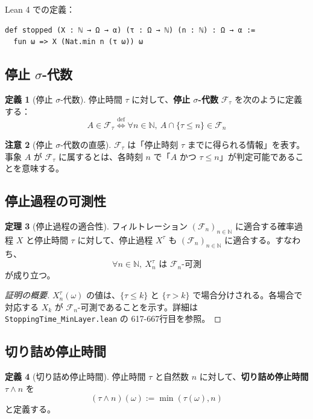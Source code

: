 \documentclass[12pt,a4paper]{article}
\theoremstyle{definition}
\newtheorem{definition}{定義}[section]
\newtheorem{theorem}[definition]{定理}
\newtheorem{remark}[definition]{注意}
\newcommand{\N}{\mathbb{N}}
\newcommand{\cF}{\mathcal{F}}
\begin{document}
Lean 4 での定義：

\begin{lstlisting}[language=Lean]
def stopped (X : ℕ → Ω → α) (τ : Ω → ℕ) (n : ℕ) : Ω → α :=
  fun ω => X (Nat.min n (τ ω)) ω
\end{lstlisting}

\subsection{停止 $\sigma$-代数}

\begin{definition}[停止 $\sigma$-代数]
停止時間 $\tau$ に対して、\textbf{停止 $\sigma$-代数} $\cF_\tau$ を次のように定義する：
\[
A \in \cF_\tau \overset{\text{def}}{\Longleftrightarrow} \forall n \in \N,\ A \cap \{\tau \leq n\} \in \cF_n
\]
\end{definition}

\begin{remark}[停止 $\sigma$-代数の直感]
$\cF_\tau$ は「停止時刻 $\tau$ までに得られる情報」を表す。事象 $A$ が $\cF_\tau$ に属するとは、各時刻 $n$ で「$A$ かつ $\tau \leq n$」が判定可能であることを意味する。
\end{remark}

\subsection{停止過程の可測性}

\begin{theorem}[停止過程の適合性]
フィルトレーション $(\cF_n)_{n \in \N}$ に適合する確率過程 $X$ と停止時間 $\tau$ に対して、停止過程 $X^\tau$ も $(\cF_n)_{n \in \N}$ に適合する。すなわち、
\[
\forall n \in \N,\ X^\tau_n \text{ は } \cF_n\text{-可測}
\]
が成り立つ。
\end{theorem}

\begin{proof}[証明の概要]
$X^\tau_n(\omega)$ の値は、$\{\tau \leq k\}$ と $\{\tau > k\}$ で場合分けされる。各場合で対応する $X_k$ が $\cF_n$-可測であることを示す。詳細は \texttt{StoppingTime\_MinLayer.lean} の 617-667行目を参照。
\end{proof}

\subsection{切り詰め停止時間}

\begin{definition}[切り詰め停止時間]
停止時間 $\tau$ と自然数 $n$ に対して、\textbf{切り詰め停止時間} $\tau \wedge n$ を
\[
(\tau \wedge n)(\omega) := \min(\tau(\omega), n)
\]
と定義する。
\end{definition}
\end{document}
